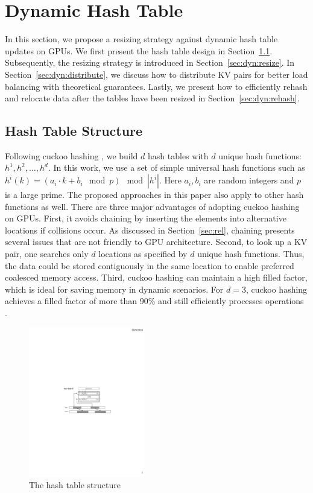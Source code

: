 \section{Dynamic Hash Table}\label{sec:dyn}
In this section, we propose a resizing strategy against dynamic hash table updates on GPUs. We first present the hash table design in Section~\ref{sec:dyn:has}.
Subsequently, the resizing strategy is introduced in Section~\ref{sec:dyn:resize}.
In Section~\ref{sec:dyn:distribute}, we discuss how to distribute KV pairs for better load balancing with theoretical guarantees. 
Lastly, we present how to efficiently rehash and relocate data after the tables have been resized in Section~\ref{sec:dyn:rehash}. 

\subsection{Hash Table Structure}\label{sec:dyn:has}
Following cuckoo hashing \cite{pagh2004cuckoo}, we build $d$ hash tables with $d$ unique hash functions: $h^1,h^2,\ldots,h^d$. 
In this work, we use a set of simple universal hash functions such as $h^i(k) = (a_i\cdot k + b_i \mod p) \mod |h^i|$.
Here $a_i,b_i$ are random integers and $p$ is a large prime.
The proposed approaches in this paper also apply to other hash functions as well. 
There are three major advantages of adopting cuckoo hashing on GPUs. 
First, it avoids chaining by inserting the elements into alternative locations if collisions occur. As discussed in Section~\ref{sec:rel}, 
chaining presents several issues that are not friendly to GPU architecture.  
Second, to look up a KV pair, one searches only $d$ locations as specified by $d$ unique hash functions. 
Thus, the data could be stored contiguously in the same location to enable preferred coalesced memory access. 
Third, cuckoo hashing can maintain a high filled factor, which is ideal for saving memory in dynamic scenarios. 
For $d=3$, cuckoo hashing achieves a filled factor of more than 90\% and still efficiently processes  operations \cite{fotakis2005space}.

\begin{figure}[t]
	\centering
	\includegraphics[width=0.45\textwidth]{fig/Hashtable.pdf}
	\caption{The hash table structure}
	\label{fig:hashtable}
\end{figure}

